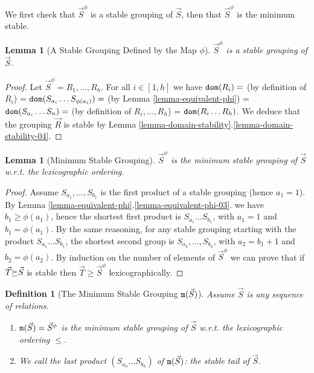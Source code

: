 \documentclass{lmcs}
\newtheorem{lemma}[theorem]{Lemma}
\newtheorem{definition}[theorem]{Definition}
\begin{document}
We first check that $\vec{S}^{\phi}$ is a stable grouping of $\vec{S}$, 
then that $\vec{S}^{\phi}$ is the minimum stable.

\begin{lemma} [A Stable Grouping Defined by the Map $\phi$]
\label{lemma-stable-phi-1}
$\vec{S}^\phi$ is a stable grouping of $\vec{S}$.
\end{lemma}

\begin{proof}
Let $\vec{S}^\phi = R_1, \ldots, R_h$. For all $i \in [1,h]$ we have
$
{\tt dom}(R_i) = 
$ 
(by definition of $R_i$)  = 
$
{\tt dom}(S_{a_i}\ldots S_{\phi(a_i)}) = 
$ 
(by Lemma \ref{lemma-equivalent-phi})  = 
$
{\tt dom}(S_{a_i}\ldots S_{n}) =
$ 
(by definition of $R_i, \ldots, R_h$)  = 
$
{\tt dom}(R_{i}\ldots R_h)
$.
We deduce that the grouping $\vec{R}$ is stable by 
Lemma \ref{lemma-domain-stability}.\ref{lemma-domain-stability-04}.
\end{proof}

\begin{lemma}[Minimum Stable Grouping]
\label{lemma-stable-phi-2}
$\vec{S}^\phi$ is the minimum stable grouping of $\vec{S}$
w.r.t. the lexicographic ordering.
\end{lemma}

\begin{proof}
Assume $S_{a_1}, \ldots, S_{b_1}$ is the first product of a stable
grouping (hence $a_1=1$). 
By Lemma \ref{lemma-equivalent-phi}.\ref{lemma-equivalent-phi-03}.
we have $b_1 \ge \phi(a_1)$, hence the shortest first product is 
$S_{a_1} \ldots S_{b_1}$, with $a_1 = 1$ and $b_1 = \phi(a_1)$.
By the same reasoning, 
for any stable grouping starting with the product $S_{a_1} \ldots S_{b_1}$, 
the shortest second group is $S_{a_2}, \ldots, S_{b_2}$, 
with $a_2 = b_1 + 1$ and $b_2 = \phi(a_2)$. By induction on the number of elements 
of $\vec{S}^\phi$ we can prove that if $\vec{T} {\succeq} \vec{S}$ is stable then
$\vec{T}  \ge \vec{S}^\phi$ lexicographically.
\end{proof}


\begin{definition}[The Minimum Stable Grouping ${\tt m}(\vec{S})$]
\label{definition-minstable}
Assume $\vec{S}$ is any sequence of relations. 
\begin{enumerate}
\item
${\tt m}(\vec{S}) = \vec{S}^\phi$
is the minimum stable grouping of $\vec{S}$ w.r.t. the lexicographic ordering $\le$.
\item
We call the last product $(S_{a_h} \ldots S_{b_h})$ of ${\tt m}(\vec{S}) $: 
 the \emph{stable tail} of $\vec{S}$.
\end{enumerate}
\end{definition}
\end{document}
